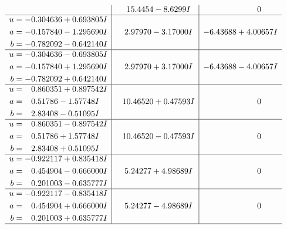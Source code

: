 \documentclass[1p]{elsarticle_modified}
\theoremstyle{definition}
\begin{document}
$$\begin{array}{c|c|c}
 & \phantom{-}15.4454 - 8.6299 I & \phantom{-0.000000 } 0 \\ \hline\begin{aligned}
u &= -0.304636 + 0.693805 I \\
a &= -0.157840 - 1.295690 I \\
b &= -0.782092 - 0.642140 I\end{aligned}
 & \phantom{-}2.97970 - 3.17000 I & -6.43688 + 4.00657 I \\ \hline\begin{aligned}
u &= -0.304636 - 0.693805 I \\
a &= -0.157840 + 1.295690 I \\
b &= -0.782092 + 0.642140 I\end{aligned}
 & \phantom{-}2.97970 + 3.17000 I & -6.43688 - 4.00657 I \\ \hline\begin{aligned}
u &= \phantom{-}0.860351 + 0.897542 I \\
a &= \phantom{-}0.51786 - 1.57748 I \\
b &= \phantom{-}2.83408 - 0.51095 I\end{aligned}
 & \phantom{-}10.46520 + 0.47593 I & \phantom{-0.000000 } 0 \\ \hline\begin{aligned}
u &= \phantom{-}0.860351 - 0.897542 I \\
a &= \phantom{-}0.51786 + 1.57748 I \\
b &= \phantom{-}2.83408 + 0.51095 I\end{aligned}
 & \phantom{-}10.46520 - 0.47593 I & \phantom{-0.000000 } 0 \\ \hline\begin{aligned}
u &= -0.922117 + 0.835418 I \\
a &= \phantom{-}0.454904 - 0.666000 I \\
b &= \phantom{-}0.201003 - 0.635777 I\end{aligned}
 & \phantom{-}5.24277 + 4.98689 I & \phantom{-0.000000 } 0 \\ \hline\begin{aligned}
u &= -0.922117 - 0.835418 I \\
a &= \phantom{-}0.454904 + 0.666000 I \\
b &= \phantom{-}0.201003 + 0.635777 I\end{aligned}
 & \phantom{-}5.24277 - 4.98689 I & \phantom{-0.000000 } 0\\
 \hline 
 \end{array}$$\newpage$$\begin{array}{c|c|c}  

\end{array}$$
\end{document}
